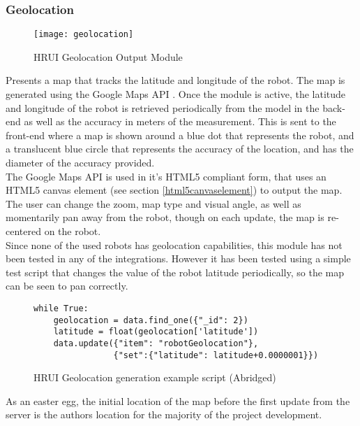 \subsubsection{Geolocation} \label{geolocation}
\begin{figure}[H]
\centering
\captionsetup{justification=centering}
\texttt{[image: geolocation]}
\caption{HRUI Geolocation Output Module}
\end{figure}
Presents a map that tracks the latitude and longitude of the robot. The map is generated using the Google Maps API
\cite{googlemaps15}. Once the module is active, the latitude and longitude of the robot is retrieved periodically from the 
model in the back-end as well as the accuracy in meters of the measurement. This is sent to the front-end where a map is 
shown around a blue dot that represents the robot, and a translucent blue circle that represents the accuracy of the 
location, and has the diameter of the accuracy provided.\\

The Google Maps API is used in it's HTML5 compliant form, that uses an HTML5 canvas element (see section 
\ref{html5canvaselement}) to output the map. The user can change the zoom, map type and visual angle, as well as momentarily 
pan away from the robot, though on each update, the map is re-centered on the robot.\\

Since none of the used robots has geolocation capabilities, this module has not been tested in any of the integrations. 
However it has been tested using a simple test script that changes the value of the robot latitude periodically, so the map 
can be seen to pan correctly.\\
\begin{figure}[H]
\captionsetup{justification=centering}
\begin{verbatim}
while True:
	geolocation = data.find_one({"_id": 2})
	latitude = float(geolocation['latitude'])
	data.update({"item": "robotGeolocation"}, 
				{"set":{"latitude": latitude+0.0000001}})

\end{verbatim}
\caption{HRUI Geolocation generation example script (Abridged)}
\end{figure}
As an easter egg, the initial location of the map before the first update from the server is the authors location for the 
majority of the project development.

